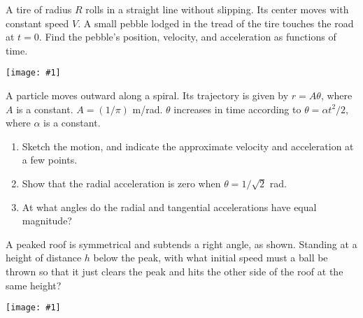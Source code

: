 \documentclass[12pt,letterpaper]{hmcpset}
\newcommand{\diagram}[1]{\begin{center}\texttt{[image: \#1]}\end{center}}
\begin{document}
\begin{solution}
\end{solution}
\newpage

\begin{problem}[1.24]

	A tire of radius $R$ rolls in a straight line without slipping. Its center moves with constant speed $V$. A small pebble lodged in the tread of the tire touches the road at $t = 0$. Find the pebble’s position, velocity, and acceleration as functions of time.

	\diagram{img/1_24}

\end{problem}

\begin{solution}
\end{solution}
\newpage

\begin{problem}[1.25]

	A particle moves outward along a spiral. Its trajectory is given by $r = A\theta$, where $A$ is a constant. $A = (1/\pi)$ m/rad. $\theta$ increases in time according to $\theta = \alpha t^2/2$, where $\alpha$ is a constant.

	\begin{enumerate}
	\item
		Sketch the motion, and indicate the approximate velocity and acceleration at a few points.
	\item
		Show that the radial acceleration is zero when $\theta = 1/\sqrt{2}$ rad.
	\item
		At what angles do the radial and tangential accelerations
have equal magnitude?
	\end{enumerate}

\end{problem}

\begin{solution}
\end{solution}
\newpage

\begin{problem}[1.27]

	A peaked roof is symmetrical and subtends a right angle, as shown. Standing at a height of distance $h$ below the peak, with what initial speed must a ball be thrown so that it just clears the peak and hits the other side of the roof at the same height?

	\diagram{img/1_27}

\end{problem}

\begin{solution}
\end{solution}
\end{document}
